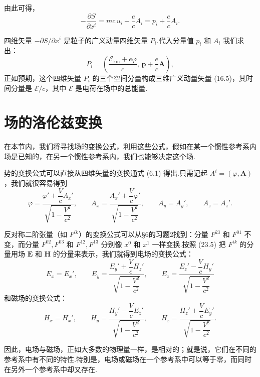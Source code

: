 由此可得，
\begin{equation}
  -\frac{\partial S}{\partial x^i}=mc\,u_i+\frac{e}{c}A_i
  =p_i+\frac{e}{c}A_i.
\end{equation}

四维矢量 $-\partial S/\partial x^i$ 是粒子的广义动量四维矢量 $P_i$.代入分量值 $p_i$ 和 $A_i$
我们求出：
\begin{equation}
  P_i=\left(\frac{\mathcal{E}_\mathrm{kin}+e\varphi}{c},\,
  \boldsymbol{p}+\frac{e}{c}\boldsymbol{A}\right),
\end{equation}
正如预期，这个四维矢量 $P_i$ 的三个空间分量构成三维广义动量矢量 (16.5)，其时间分量是
$\mathcal{E}/c$，其中 $\mathcal{E}$ 是电荷在场中的总能量.

\section{场的洛伦兹变换}

在本节内，我们将寻找场的变换公式，利用这些公式，假如在某一个惯性参考系内场是已知的，在另一个惯性参考系内，我们也能够决定这个场.

势的变换公式可以直接从四维矢量的变换通式 (6.1) 得出.只需记起
$A^i=(\varphi,\boldsymbol{A})$，我们就很容易得到
\begin{equation}
  \varphi=\frac{\varphi'+\dfrac{V}{c}A_x'}
  {\sqrt{1-\dfrac{V^2}{c^2}}},\qquad
  A_x=\frac{A_x'+\dfrac{V}{c}\varphi'}
  {\sqrt{1-\dfrac{V^2}{c^2}}},\qquad
  A_y=A_y',\qquad
  A_z=A_z'.
\end{equation}

反对称二阶张量（如 $F^{ik}$）的变换公式可以从§6的习题2找到：分量 $F^{23}$ 和 $F^{01}$
不变，而分量 $F^{02},F^{03}$ 和 $F^{12},F^{13}$ 分别像 $x^0$ 和 $x^1$
一样变换.按照 (23.5) 把 $F^{ik}$ 的分量用场 $\boldsymbol{E}$ 和 $\boldsymbol{H}$
的分量来表示，我们就得到电场的变换公式：
\begin{equation}
  E_x=E_x',\qquad
  E_y=\frac{E_y'+\dfrac{V}{c}H_z'}{\sqrt{1-\dfrac{V^2}{c^2}}},\qquad
  E_z=\frac{E_z'-\dfrac{V}{c}H_y'}{\sqrt{1-\dfrac{V^2}{c^2}}}
\end{equation}
和磁场的变换公式：
\begin{equation}
  H_x=H_x',\qquad
  H_y=\frac{H_y'-\dfrac{V}{c}E_z'}{\sqrt{1-\dfrac{V^2}{c^2}}},\qquad
  H_z=\frac{H_z'+\dfrac{V}{c}E_y'}{\sqrt{1-\dfrac{V^2}{c^2}}}.
\end{equation}

因此，电场与磁场，正如大多数的物理量一样，是相对的；就是说，它们在不同的参考系中有不同的特性.特别是，电场或磁场在一个参考系中可以等于零，而同时在另外一个参考系中却又存在.

